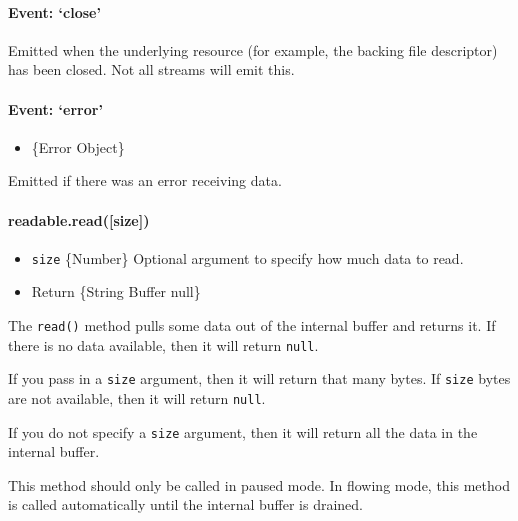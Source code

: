 \paragraph{Event: `close'}\label{event-close}

Emitted when the underlying resource (for example, the backing file
descriptor) has been closed. Not all streams will emit this.

\paragraph{Event: `error'}\label{event-error}

\begin{itemize}
\itemsep1pt\parskip0pt
\item
  \{Error Object\}
\end{itemize}

Emitted if there was an error receiving data.

\paragraph{readable.read({[}size{]})}\label{readable.readsize}

\begin{itemize}
\itemsep1pt\parskip0pt
\item
  \texttt{size} \{Number\} Optional argument to specify how much data to
  read.
\item
  Return \{String \textbar{} Buffer \textbar{} null\}
\end{itemize}

The \texttt{read()} method pulls some data out of the internal buffer
and returns it. If there is no data available, then it will return
\texttt{null}.

If you pass in a \texttt{size} argument, then it will return that many
bytes. If \texttt{size} bytes are not available, then it will return
\texttt{null}.

If you do not specify a \texttt{size} argument, then it will return all
the data in the internal buffer.

This method should only be called in paused mode. In flowing mode, this
method is called automatically until the internal buffer is drained.

\begin{Shaded}
\end{Shaded}

